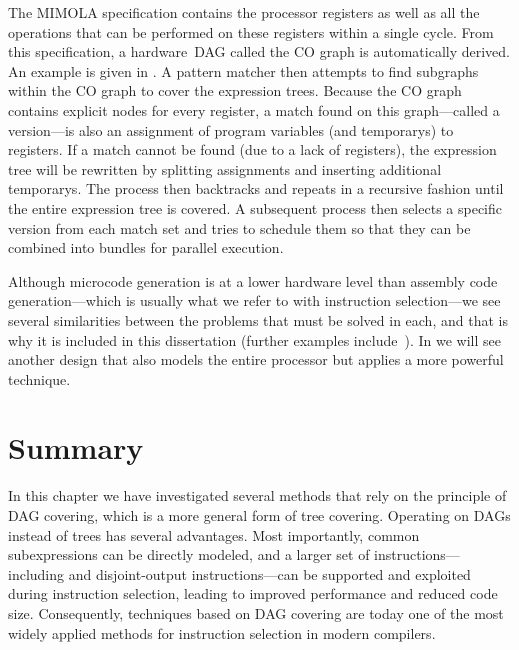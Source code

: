 %  

The \gls{MIMOLA} specification contains the processor \glspl{register} as well
as all the operations that can be performed on these \glspl{register} within a
single cycle.
%
From this specification, a hardware~\gls{DAG} called the \gls{CO
  graph} is automatically derived.
%
An example is given in
.
%
A \gls{pattern matcher} then attempts to find
\glspl{subgraph} within the \gls{CO graph} to cover the \glspl{expression tree}.
%
Because the \gls{CO graph} contains explicit \glspl{node} for every
\gls{register}, a \gls{match} found on this \gls{graph}---called a
\gls{version}---is also an assignment of \gls{program} variables (and
\glspl{temporary}) to \glspl{register}.
%
If a \gls{match} cannot be found (due to
a lack of \glspl{register}), the \gls{expression tree} will be rewritten by
splitting assignments and inserting additional \glspl{temporary}.
%
The process
then backtracks and repeats in a recursive fashion until the entire \gls{expression tree} is covered.
%
A subsequent process then selects a specific \gls{version}
from each \gls{match set} and tries to schedule them so that they can be combined
into \glspl{bundle} for parallel execution.

Although \gls{microcode generation} is at a lower hardware level than
\gls{assembly code} generation---which is usually what we refer to with
\gls{instruction selection}---we see several similarities between the problems
that must be solved in each, and that is why it is included in this dissertation
(further examples include~\cite{Balakrishnan1986, Mahmood1990,
  Langevin1993}).
%
In  we will see another design that
also models the entire processor but applies a more powerful technique.


\section{Summary}

In this chapter we have investigated several methods that rely on the
\gls{principle} of \gls{DAG covering}, which is a more general form of \gls{tree
  covering}.
%
Operating on \glspl{DAG} instead of \glspl{tree} has several
advantages.
%
Most importantly, common subexpressions can be directly modeled, and
a larger set of \glspl{instruction}---including  and \glspl{disjoint-output instruction}---can be supported and
exploited during \gls{instruction selection}, leading to improved performance
and reduced code size.
%
Consequently, techniques based on \gls{DAG covering} are
today one of the most widely applied methods for \gls{instruction selection} in
modern \glspl{compiler}.


